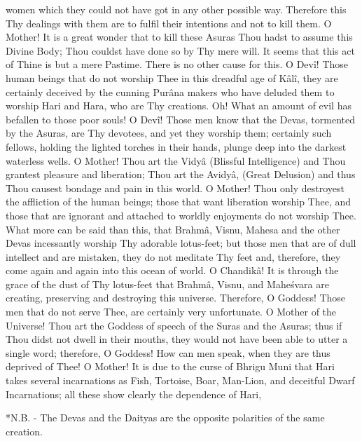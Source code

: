 women which they could not have got in any other possible way. Therefore this Thy dealings with them are to fulfil their intentions and not to kill them. O Mother! It is a great wonder that to kill these Asuras Thou hadst to assume this Divine Body; Thou couldst have done so by Thy mere will. It seems that this act of Thine is but a mere Pastime. There is no other cause for this. O Dev\^i! Those human beings that do not worship Thee in this dreadful age of K\^al\^i, they are certainly deceived by the cunning Pur\^ana makers who have deluded them to worship Hari and Hara, who are Thy creations. Oh! What an amount of evil has befallen to those poor souls! O Dev\^i! Those men know that the Devas, tormented by the Asuras, are Thy devotees, and yet they worship them; certainly such fellows, holding the lighted torches in their hands, plunge deep into the darkest waterless wells. O Mother! Thou art the Vidy\^a (Blissful Intelligence) and Thou grantest pleasure and liberation; Thou art the Avidy\^a, (Great Delusion) and thus Thou causest bondage and pain in this world. O Mother! Thou only destroyest the affliction of the human beings; those that want liberation worship Thee, and those that are ignorant and attached to worldly enjoyments do not worship Thee. What more can be said than this, that Brahm\^a, Visnu, Mahesa and the other Devas incessantly worship Thy adorable lotus-feet; but those men that are of dull intellect and are mistaken, they do not meditate Thy feet and, therefore, they come again and again into this ocean of world. O Chandik\^a! It is through the grace of the dust of Thy lotus-feet that Brahm\^a, Visnu, and Mahe\'svara are creating, preserving and destroying this universe. Therefore, O Goddess! Those men that do not serve Thee, are certainly very unfortunate. O Mother of the Universe! Thou art the Goddess of speech of the Suras and the Asuras; thus if Thou didst not dwell in their mouths, they would not have been able to utter a single word; therefore, O Goddess! How can men speak, when they are thus deprived of Thee! O Mother! It is due to the curse of Bhrigu Muni that Hari takes several incarnations as Fish, Tortoise, Boar, Man-Lion, and deceitful Dwarf Incarnations; all these show clearly the dependence of Hari,

*N.B. - The Devas and the Daityas are the opposite polarities of the same creation.

